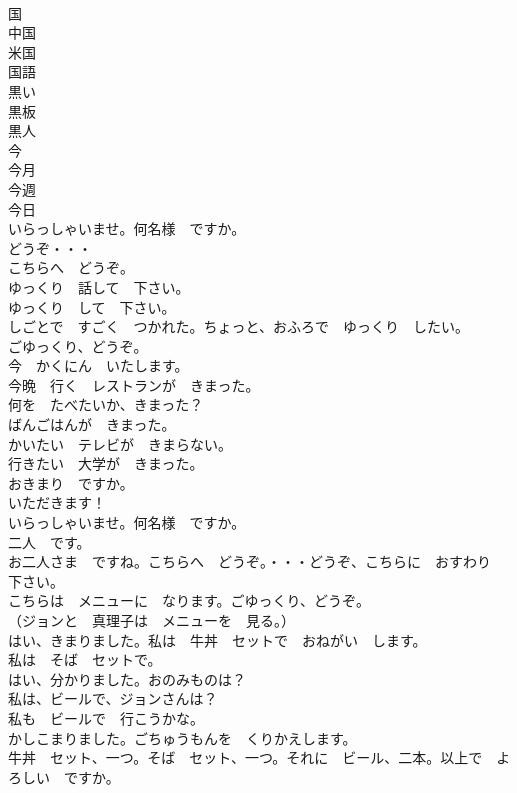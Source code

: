 \documentclass[8pt]{extreport}
\begin{document}
\begin{CJK}{UTF8}{min}
\\	国	
\\	中国	
\\	米国	
\\	国語	
\\	黒い	
\\	黒板	
\\	黒人	
\\	今	
\\	今月	
\\	今週	
\\	今日	
\\	いらっしゃいませ。何名様　ですか。	
\\	どうぞ・・・	
\\	こちらへ　どうぞ。	
\\	ゆっくり　話して　下さい。	
\\	ゆっくり　して　下さい。	
\\	しごとで　すごく　つかれた。ちょっと、おふろで　ゆっくり　したい。	
\\	ごゆっくり、どうぞ。	
\\	今　かくにん　いたします。	
\\	今晩　行く　レストランが　きまった。	
\\	何を　たべたいか、きまった？	
\\	ばんごはんが　きまった。	
\\	かいたい　テレビが　きまらない。	
\\	行きたい　大学が　きまった。	
\\	おきまり　ですか。	
\\	いただきます！	
\\	いらっしゃいませ。何名様　ですか。	
\\	二人　です。	
\\	お二人さま　ですね。こちらへ　どうぞ。・・・どうぞ、こちらに　おすわり　下さい。	
\\	こちらは　メニューに　なります。ごゆっくり、どうぞ。	
\\	（ジョンと　真理子は　メニューを　見る。）	
\\	はい、きまりました。私は　牛丼　セットで　おねがい　します。	
\\	私は　そば　セットで。	
\\	はい、分かりました。おのみものは？	
\\	私は、ビールで、ジョンさんは？	
\\	私も　ビールで　行こうかな。	
\\	かしこまりました。ごちゅうもんを　くりかえします。	
\\	牛丼　セット、一つ。そば　セット、一つ。それに　ビール、二本。以上で　よろしい　ですか。	

\end{CJK}
\end{document}
